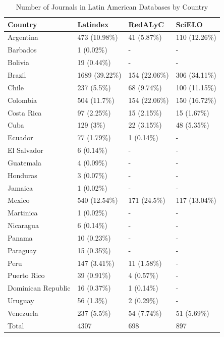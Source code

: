 \begin{table}[!htbp]
\centering
\caption{Number of Journals in Latin American Databases by Country} \label{country_coverage}
\begin{tabular}{@{}llll@{}}
\toprule
Country            & Latindex       & RedALyC       & SciELO        \\ \midrule
Argentina          & 473 (10.98\%)  & 41 (5.87\%)   & 110 (12.26\%) \\
Barbados           & 1 (0.02\%)     & -             & -             \\
Bolivia            & 19 (0.44\%)    & -             & -             \\
Brazil             & 1689 (39.22\%) & 154 (22.06\%) & 306 (34.11\%) \\
Chile              & 237 (5.5\%)    & 68 (9.74\%)   & 100 (11.15\%) \\
Colombia           & 504 (11.7\%)   & 154 (22.06\%) & 150 (16.72\%) \\
Costa Rica         & 97 (2.25\%)    & 15 (2.15\%)   & 15 (1.67\%)   \\
Cuba               & 129 (3\%)      & 22 (3.15\%)   & 48 (5.35\%)   \\
Ecuador            & 77 (1.79\%)    & 1 (0.14\%)    & -             \\
El Salvador        & 6 (0.14\%)     & -             & -             \\
Guatemala          & 4 (0.09\%)     & -             & -             \\
Honduras           & 3 (0.07\%)     & -             & -             \\
Jamaica            & 1 (0.02\%)     & -             & -             \\
Mexico             & 540 (12.54\%)  & 171 (24.5\%)  & 117 (13.04\%) \\
Martinica          & 1 (0.02\%)     & -             & -             \\
Nicaragua          & 6 (0.14\%)     & -             & -             \\
Panama             & 10 (0.23\%)    & -             & -             \\
Paraguay           & 15 (0.35\%)    & -             & -             \\
Peru               & 147 (3.41\%)   & 11 (1.58\%)   & -             \\
Puerto Rico        & 39 (0.91\%)    & 4 (0.57\%)    & -             \\
Dominican Republic & 16 (0.37\%)    & 1 (0.14\%)    & -             \\
Uruguay            & 56 (1.3\%)     & 2 (0.29\%)    & -             \\
Venezuela          & 237 (5.5\%)    & 54 (7.74\%)   & 51 (5.69\%)   \\ \midrule
Total              & 4307           & 698           & 897           \\ \bottomrule
\end{tabular}
\end{table}



